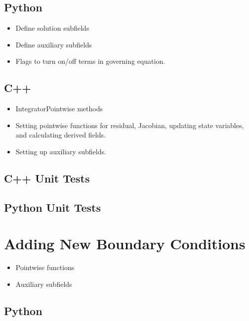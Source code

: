 \subsection{Python}


\begin{itemize}
\item Define solution subfields
\item Define auxiliary subfields
\item Flags to turn on/off terms in governing equation.
\end{itemize}

\subsection{C++}

\begin{itemize}
\item IntegratorPointwise methods
\item Setting pointwise functions for residual, Jacobian, updating
  state variables, and calculating derived fields.
\item Setting up auxiliary subfields.
\end{itemize}
  
\subsection{C++ Unit Tests}

\subsection{Python Unit Tests}

\section{Adding New Boundary Conditions}


\begin{itemize}
\item Pointwise functions
\item Auxiliary subfields
\end{itemize}

\subsection{Python}

